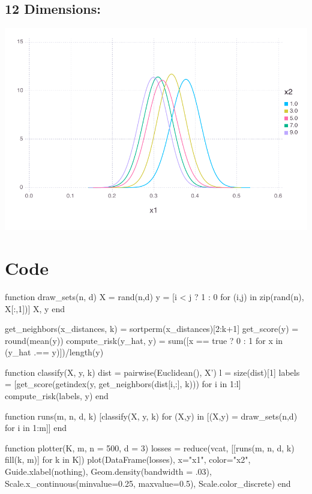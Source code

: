 \documentclass[a4paper,12pt]{article}
\begin{document}
\subsection*{12 Dimensions:}
\includegraphics[width=\linewidth]{figures/two_4_1.pdf}



\section*{Code}

\begin{juliacode}
function draw_sets(n, d)
    X = rand(n,d)
    y = [i < j ? 1 : 0 for (i,j) in zip(rand(n), X[:,1])]
    X, y
end

get_neighbors(x_distances, k) = sortperm(x_distances)[2:k+1]
get_score(y) = round(mean(y))
compute_risk(y_hat, y) = sum([x == true ? 0 : 1 for x in (y_hat .== y)])/length(y)

function classify(X, y, k)
    dist = pairwise(Euclidean(), X')
    l = size(dist)[1]
    labels = [get_score(getindex(y, get_neighbors(dist[i,:], k))) for i in 1:l]
    compute_risk(labels, y)
end

function runs(m, n, d, k)
    [classify(X, y, k) for (X,y) in [(X,y) = draw_sets(n,d) for i in 1:m]]
end

function plotter(K, m, n = 500, d = 3)
    losses = reduce(vcat, [[runs(m, n, d, k) fill(k, m)] for k in K])
    plot(DataFrame(losses), x="x1", color="x2",
         Guide.xlabel(nothing),
         Geom.density(bandwidth = .03),
         Scale.x_continuous(minvalue=0.25, maxvalue=0.5),
         Scale.color_discrete)
end
\end{juliacode}
\end{document}
